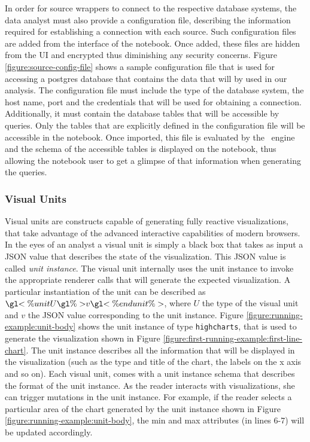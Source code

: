In order for source wrappers to connect to the respective database systems, the data analyst must also provide a configuration file, describing the information required for establishing a connection with each source. Such configuration files are added from the interface of the notebook. Once added, these files are hidden from the UI and encrypted thus diminishing any security concerns. Figure \ref{figure:source-config-file} shows a sample configuration file that is used for accessing a postgres database that contains the data that will by used in our analysis. The configuration file must include the type of the database system, the host name, port and the credentials that will be used for obtaining a connection. Additionally, it must contain the database tables that will be accessible by queries. Only the tables that are explicitly defined in the configuration file will be accessible in the notebook. Once imported, this file is evaluated by the \projname\ engine and the schema of the accessible tables is displayed on the notebook, thus allowing the notebook user to get a glimpse of that information when generating the queries. 





\subsubsection*{Visual Units}
Visual units are constructs capable of generating fully reactive visualizations, that take advantage of the advanced interactive capabilities of modern browsers. In the eyes of an analyst a visual unit is simply a black box that takes as input a JSON value that describes the state of the visualization. This JSON value is called \emph{unit instance}. The visual unit internally uses the unit instance to invoke the appropriate renderer calls that will generate the expected visualization. A particular instantiation of the unit  can be described as $\gl{<\% unit } U \gl{ \%> } v \gl{ <\% end unit \%>}$, where $U$ the type of the visual unit and $v$ the JSON value corresponding to the unit instance. Figure \ref{figure:running-example:unit-body} shows the unit instance of type \texttt{highcharts}, that is used to generate the visualization shown in Figure \ref{figure:first-running-example:first-line-chart}. The unit instance describes all the information that will be displayed in the visualization (such as the type and title of the chart, the labels on the x axis and so on). Each visual unit, comes with a unit instance schema that describes the format of the unit instance. As the reader interacts with visualizations, she can trigger mutations in the unit instance. For example, if the reader selects a particular area of the chart generated by the unit instance shown in Figure \ref{figure:running-example:unit-body}, the min and max attributes (in lines 6-7) will be updated accordingly.



